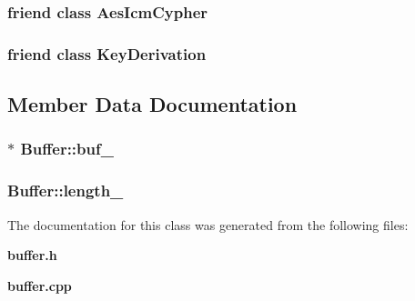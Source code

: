 \subsubsection{\setlength{\rightskip}{0pt plus 5cm}friend class {\bf Aes\-Icm\-Cypher}\hspace{0.3cm}{\tt  [friend]}}\label{classBuffer_41d791e5b640813dea34c24c11056581}


\subsubsection{\setlength{\rightskip}{0pt plus 5cm}friend class {\bf Key\-Derivation}\hspace{0.3cm}{\tt  [friend]}}\label{classBuffer_1d039eb05e29b8eeadca9b474bb6d49f}




\subsection{Member Data Documentation}
\subsubsection{$\ast$ {\bf Buffer::buf\_\-}\hspace{0.3cm}{\tt  [protected]}}\label{classBuffer_e60240b77a315e6b3c2bf88592d0be48}


\subsubsection{ {\bf Buffer::length\_\-}\hspace{0.3cm}{\tt  [protected]}}\label{classBuffer_d3a779d2403b5183427f12554e2f51c3}




The documentation for this class was generated from the following files:\begin{CompactItemize}
\item 
{\bf buffer.h}\item 
{\bf buffer.cpp}\end{CompactItemize}
